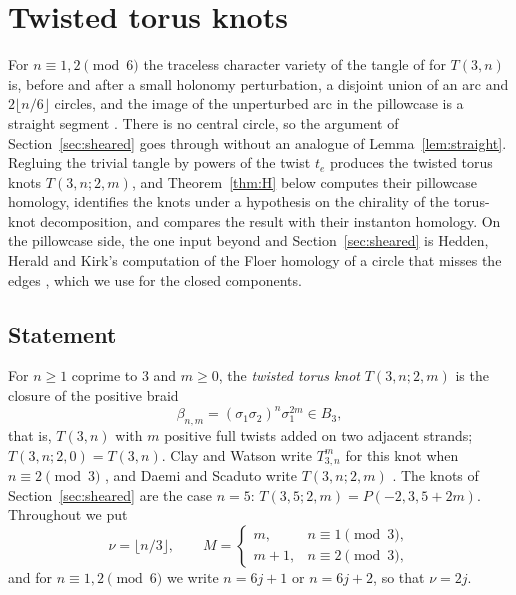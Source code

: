 \section{Twisted torus knots}\label{sec:twisted}

For $n\equiv1,2\pmod 6$ the traceless character variety of the tangle of \cite[\S10]{HHK2} for $T(3,n)$ is,
before and after a small holonomy perturbation, a disjoint union of an arc and $2\lfloor n/6\rfloor$ circles,
and the image of the unperturbed arc in the pillowcase is a straight segment
\cite[Props.~3.6, 3.9 and~5.7]{WuebbenV}. There is no central circle,
so the argument of Section~\ref{sec:sheared} goes through without an analogue of
Lemma~\ref{lem:straight}. Regluing the trivial tangle by powers of the twist $t_e$ produces the twisted
torus knots $T(3,n;2,m)$, and Theorem~\ref{thm:H} below computes their pillowcase homology, identifies the knots under a hypothesis on the chirality of the torus-knot decomposition, and compares the result with their instanton homology. On the pillowcase side, the one input
beyond \cite{WuebbenV} and Section~\ref{sec:sheared} is Hedden, Herald and Kirk's computation of the Floer
homology of a circle that misses the edges \cite[Thm.~5.4]{HHK2}, which we use for the closed components.

\subsection{Statement}\label{ss:twisted-statement}
For $n\ge1$ coprime to $3$ and $m\ge0$, the \emph{twisted torus knot} $T(3,n;2,m)$ is the closure of the
positive braid
\[
\beta_{n,m}=(\sigma_1\sigma_2)^n\sigma_1^{2m}\in B_3 ,
\]
that is, $T(3,n)$ with $m$ positive full twists added on two adjacent strands; $T(3,n;2,0)=T(3,n)$. Clay
and Watson write $T^m_{3,n}$ for this knot when $n\equiv2\pmod3$ \cite[\S3.2]{ClayWatson}, and Daemi and Scaduto write
$T(3,n;2,m)$ \cite[\S8.5]{DS24}. The knots of Section~\ref{sec:sheared} are the case $n=5$:
$T(3,5;2,m)=P(-2,3,5+2m)$. Throughout we put
\[
\nu=\lfloor n/3\rfloor,\qquad M=\begin{cases}m,&n\equiv1\pmod3,\\ m+1,&n\equiv2\pmod3,\end{cases}
\]
and for $n\equiv1,2\pmod6$ we write $n=6j+1$ or $n=6j+2$, so that $\nu=2j$.

